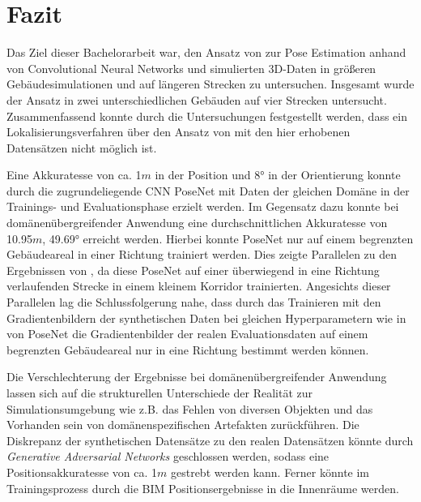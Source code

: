
\section{Fazit}
\label{sec:kapitel_6}
Das Ziel dieser Bachelorarbeit war, den Ansatz von \citet{acharyaBIMPoseNetIndoorCamera2019} zur Pose Estimation anhand von Convolutional Neural Networks und simulierten 3D-Daten in größeren Gebäudesimulationen und auf längeren Strecken zu untersuchen.
Insgesamt wurde der Ansatz in zwei unterschiedlichen Gebäuden auf vier Strecken untersucht. Zusammenfassend konnte durch die Untersuchungen festgestellt werden, dass ein Lokalisierungsverfahren über den Ansatz von \citet{acharyaBIMPoseNetIndoorCamera2019} mit den hier erhobenen Datensätzen nicht möglich ist.


Eine Akkuratesse von ca. 1$m$ in der Position und 8° in der Orientierung konnte durch die zugrundeliegende CNN PoseNet mit Daten der gleichen Domäne in der Trainings- und Evaluationsphase erzielt werden. Im Gegensatz dazu konnte bei domänenübergreifender Anwendung eine durchschnittlichen Akkuratesse von 10.95$m$, 49.69° erreicht werden. Hierbei konnte PoseNet nur auf einem begrenzten Gebäudeareal in einer Richtung trainiert werden. Dies zeigte Parallelen zu den Ergebnissen von \citet{acharyaBIMPoseNetIndoorCamera2019}, da diese PoseNet auf einer überwiegend in eine Richtung verlaufenden Strecke in einem kleinem Korridor trainierten. Angesichts dieser Parallelen lag die Schlussfolgerung nahe, dass durch das Trainieren mit den Gradientenbildern der synthetischen Daten bei gleichen Hyperparametern wie in \cite{acharyaBIMPoseNetIndoorCamera2019} von PoseNet die Gradientenbilder der realen Evaluationsdaten auf einem begrenzten Gebäudeareal nur in eine Richtung bestimmt werden können.



Die Verschlechterung der Ergebnisse bei domänenübergreifender Anwendung lassen sich auf die strukturellen Unterschiede der Realität zur Simulationsumgebung wie z.B. das Fehlen von diversen Objekten und das Vorhanden sein von domänenspezifischen Artefakten zurückführen. Die Diskrepanz der synthetischen Datensätze zu den realen Datensätzen könnte durch \textit{Generative Adversarial Networks} geschlossen werden, sodass eine Positionsakkuratesse von ca. 1$m$ gestrebt werden kann.  Ferner könnte im Trainingsprozess durch die BIM Positionsergebnisse in die Innenräume werden. 

